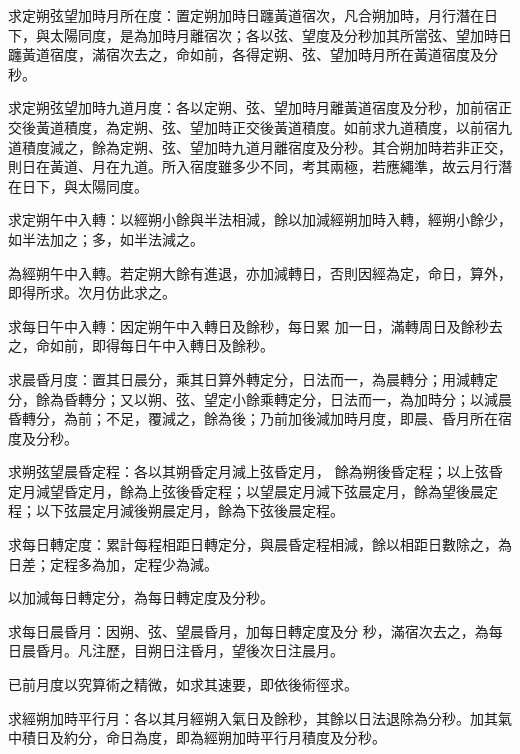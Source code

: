 \begin{pinyinscope}
 求定朔弦望加時月所在度：置定朔加時日躔黃道宿次，凡合朔加時，月行潛在日下，與太陽同度，是為加時月離宿次；各以弦、望度及分秒加其所當弦、望加時日躔黃道宿度，滿宿次去之，命如前，各得定朔、弦、望加時月所在黃道宿度及分秒。



 求定朔弦望加時九道月度：各以定朔、弦、望加時月離黃道宿度及分秒，加前宿正交後黃道積度，為定朔、弦、望加時正交後黃道積度。如前求九道積度，以前宿九
 道積度減之，餘為定朔、弦、望加時九道月離宿度及分秒。其合朔加時若非正交，則日在黃道、月在九道。所入宿度雖多少不同，考其兩極，若應繩準，故云月行潛在日下，與太陽同度。



 求定朔午中入轉：以經朔小餘與半法相減，餘以加減經朔加時入轉，經朔小餘少，如半法加之；多，如半法減之。



 為經朔午中入轉。若定朔大餘有進退，亦加減轉日，否則因經為定，命日，算外，即得所求。次月仿此求之。



 求每日午中入轉：因定朔午中入轉日及餘秒，每日累
 加一日，滿轉周日及餘秒去之，命如前，即得每日午中入轉日及餘秒。



 求晨昏月度：置其日晨分，乘其日算外轉定分，日法而一，為晨轉分；用減轉定分，餘為昏轉分；又以朔、弦、望定小餘乘轉定分，日法而一，為加時分；以減晨昏轉分，為前；不足，覆減之，餘為後；乃前加後減加時月度，即晨、昏月所在宿度及分秒。



 求朔弦望晨昏定程：各以其朔昏定月減上弦昏定月，
 餘為朔後昏定程；以上弦昏定月減望昏定月，餘為上弦後昏定程；以望晨定月減下弦晨定月，餘為望後晨定程；以下弦晨定月減後朔晨定月，餘為下弦後晨定程。



 求每日轉定度：累計每程相距日轉定分，與晨昏定程相減，餘以相距日數除之，為日差；定程多為加，定程少為減。



 以加減每日轉定分，為每日轉定度及分秒。



 求每日晨昏月：因朔、弦、望晨昏月，加每日轉定度及分
 秒，滿宿次去之，為每日晨昏月。凡注歷，目朔日注昏月，望後次日注晨月。



 已前月度以究算術之精微，如求其速要，即依後術徑求。



 求經朔加時平行月：各以其月經朔入氣日及餘秒，其餘以日法退除為分秒。加其氣中積日及約分，命日為度，即為經朔加時平行月積度及分秒。




\end{pinyinscope}
